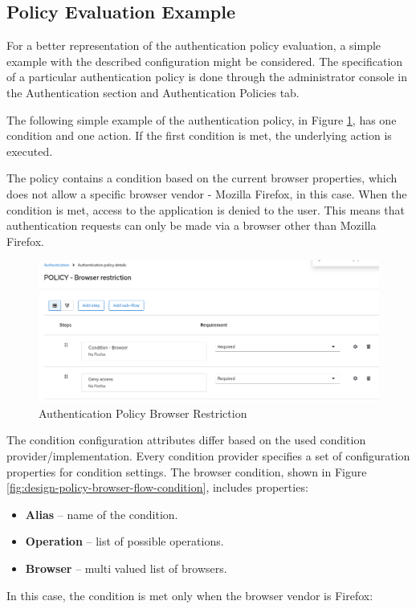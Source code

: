 \newpage

\subsection{Policy Evaluation Example}
For a better representation of the authentication policy evaluation, a simple example with the described configuration might be considered.
The specification of a particular authentication policy is done through the administrator console in the Authentication section and Authentication Policies tab.

The following simple example of the authentication policy, in Figure \ref{fig:design-policy-browser-flow}, has one condition and one action.
If the first condition is met, the underlying action is executed.

The policy contains a condition based on the current browser properties, which does not allow a specific browser vendor - Mozilla Firefox, in this case.
When the condition is met, access to the application is denied to the user.
This means that authentication requests can only be made via a browser other than Mozilla Firefox.

\begin{figure}[htbp]
  \centering
  \includegraphics[width=1\textwidth]{img/sections/5-design/policy-browser-flow.png}
  \caption{Authentication Policy Browser Restriction}
  \label{fig:design-policy-browser-flow}
\end{figure}

\newpage

The condition configuration attributes differ based on the used condition provider/implementation.
Every condition provider specifies a set of configuration properties for condition settings.
\newline
\newline
The browser condition, shown in Figure \ref{fig:design-policy-browser-flow-condition}, includes properties:

\begin{itemize}
    \item \textbf{Alias} -- name of the condition.
    \item \textbf{Operation} -- list of possible operations.
    \item \textbf{Browser} -- multi valued list of browsers. 
\end{itemize}
\newline
\newline
In this case, the condition is met only when the browser vendor is Firefox:

